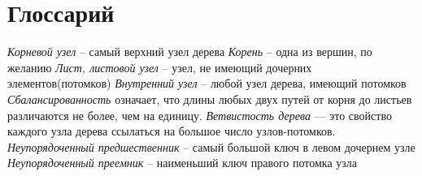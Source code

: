 
    \section{Глоссарий}\par
        \large
        \textit{Корневой узел} – самый верхний узел дерева \newline
        \textit{Корень} – одна из вершин, по желанию \newline
        \textit{Лист, листовой узел} – узел, не имеющий дочерних элементов(потомков) \newline
        \textit{Внутренний узел} – любой узел дерева, имеющий потомков \newline
        \textit{Сбалансированность} означает, что длины любых двух путей от корня до листьев различаются не более, чем на единицу. \newline
        \textit{Ветвистость дерева} — это свойство каждого узла дерева ссылаться на большое число узлов-потомков.\newline
        \textit{Неупорядоченный предшественник} – самый большой ключ в левом дочернем узле \newline
        \textit{Неупорядоченный преемник} – наименьший ключ правого потомка узла \newline
        \newpage
